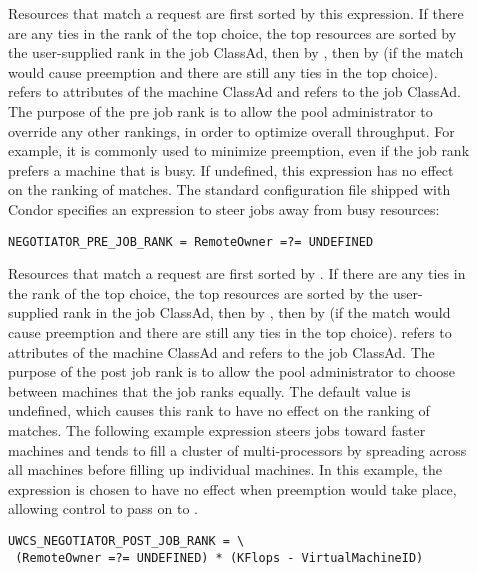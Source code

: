 \begin{description}
\item[]
  \label{param:NegotiatorPreJobRank} Resources that match a request
  are first sorted by this expression.  If there are any ties in the
  rank of the top choice, the top resources are sorted by the
  user-supplied rank in the job ClassAd, then by
  , then by
   (if the match would cause preemption and
  there are still any ties in the top choice).  \verb@MY@ refers to
  attributes of the machine ClassAd and \verb@TARGET@ refers to the
  job ClassAd.  The purpose of the pre job rank is to allow the pool
  administrator to override any other rankings, in order to optimize
  overall throughput.  For example, it is commonly used to minimize
  preemption, even if the job rank prefers a machine that is busy.  If
  undefined, this expression has no effect on the ranking of matches.
  The standard configuration file shipped with Condor specifies an
  expression to steer jobs away from busy resources:

\begin{verbatim}
NEGOTIATOR_PRE_JOB_RANK = RemoteOwner =?= UNDEFINED
\end{verbatim}

\item[]
  \label{param:NegotiatorPostJobRank}
  Resources that match a request are first sorted by
  .  If there are any ties in the
  rank of the top choice, the top resources are sorted by the
  user-supplied rank in the job ClassAd, then by
  , then by
   (if the match would cause preemption and
  there are still any ties in the top choice).  \verb@MY@ refers to
  attributes of the machine ClassAd and \verb@TARGET@ refers to the
  job ClassAd.  The purpose of the post job rank is to allow the pool
  administrator to choose between machines that the job ranks equally.
  The default value is undefined, which causes this rank to have no
  effect on the ranking of matches.  The following example expression
  steers jobs toward faster machines and tends to fill a cluster of
  multi-processors by spreading across all machines before filling up
  individual machines.  In this example, the expression is chosen to
  have no effect when preemption would take place, allowing control to
  pass on to .

\begin{verbatim}
UWCS_NEGOTIATOR_POST_JOB_RANK = \
 (RemoteOwner =?= UNDEFINED) * (KFlops - VirtualMachineID)
\end{verbatim}



\end{description}

